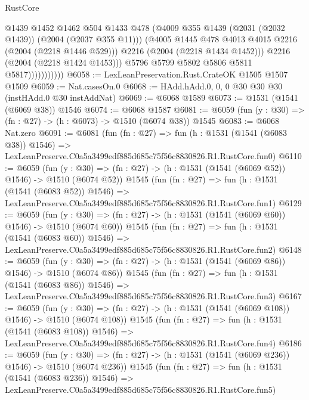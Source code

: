 \begin{lexlean}{RustCore}
\begin{coremodule}
                              @1439
                              @1452
                              @1462
                              @504
                              @1433
                              @478
                              (@4009 @355 @1439 (@2031 (@2032 @1439)) (@2004 (@2037 @355 @11)))
                              (@4005 @1445 @478 @4013 @4015 @2216 (@2004 (@2218 @1446 @529)))
                              @2216
                              (@2004 (@2218 @1434 @1452)))
                            @2216
                            (@2004 (@2218 @1424 @1453)))
                          @5796
                          @5799
                          @5802
                          @5806
                          @5811
                          @5817)))))))))))
@6058 := LexLeanPreservation.Rust.CrateOK @1505 @1507 @1509
@6059 := Nat.casesOn.{0}
@6068 := HAdd.hAdd.{0, 0, 0} @30 @30 @30 (instHAdd.{0} @30 instAddNat)
@6069 := @6068 @1589
@6073 := @1531 (@1541 (@6069 @38)) @1546
@6074 := @6068 @1587
@6081 := @6059 (fun (y : @30) => (fn : @27) -> (h : @6073) -> @1510 (@6074 @38)) @1545
@6083 := @6068 Nat.zero
@6091 := @6081
    (fun (fn : @27) =>
    fun (h : @1531 (@1541 (@6083 @38)) @1546) =>
    LexLeanPreserve.C0a5a3499edf885d685c75f56c8830826.R1.RustCore.fun0)
@6110 := @6059
    (fun (y : @30) => (fn : @27) -> (h : @1531 (@1541 (@6069 @52)) @1546) -> @1510 (@6074 @52))
    @1545
    (fun (fn : @27) =>
    fun (h : @1531 (@1541 (@6083 @52)) @1546) =>
    LexLeanPreserve.C0a5a3499edf885d685c75f56c8830826.R1.RustCore.fun1)
@6129 := @6059
    (fun (y : @30) => (fn : @27) -> (h : @1531 (@1541 (@6069 @60)) @1546) -> @1510 (@6074 @60))
    @1545
    (fun (fn : @27) =>
    fun (h : @1531 (@1541 (@6083 @60)) @1546) =>
    LexLeanPreserve.C0a5a3499edf885d685c75f56c8830826.R1.RustCore.fun2)
@6148 := @6059
    (fun (y : @30) => (fn : @27) -> (h : @1531 (@1541 (@6069 @86)) @1546) -> @1510 (@6074 @86))
    @1545
    (fun (fn : @27) =>
    fun (h : @1531 (@1541 (@6083 @86)) @1546) =>
    LexLeanPreserve.C0a5a3499edf885d685c75f56c8830826.R1.RustCore.fun3)
@6167 := @6059
    (fun (y : @30) => (fn : @27) -> (h : @1531 (@1541 (@6069 @108)) @1546) -> @1510 (@6074 @108))
    @1545
    (fun (fn : @27) =>
    fun (h : @1531 (@1541 (@6083 @108)) @1546) =>
    LexLeanPreserve.C0a5a3499edf885d685c75f56c8830826.R1.RustCore.fun4)
@6186 := @6059
    (fun (y : @30) => (fn : @27) -> (h : @1531 (@1541 (@6069 @236)) @1546) -> @1510 (@6074 @236))
    @1545
    (fun (fn : @27) =>
    fun (h : @1531 (@1541 (@6083 @236)) @1546) =>
    LexLeanPreserve.C0a5a3499edf885d685c75f56c8830826.R1.RustCore.fun5)

\end{coremodule}
\end{lexlean}
